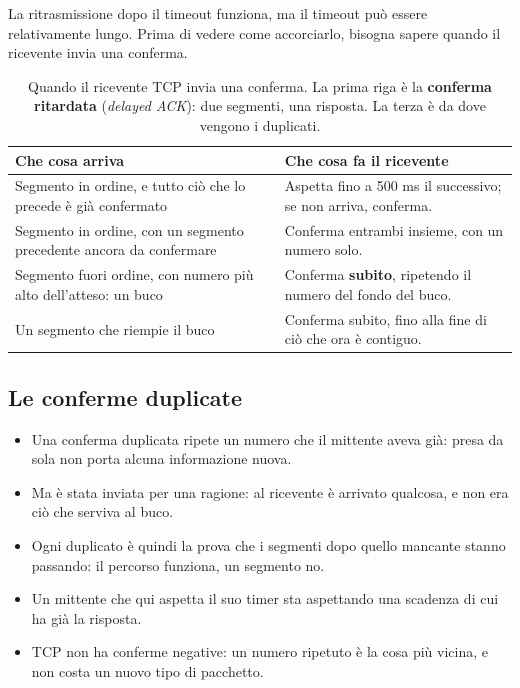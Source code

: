 La ritrasmissione dopo il timeout funziona, ma il timeout può essere relativamente lungo. Prima di vedere come
accorciarlo, bisogna sapere quando il ricevente invia una conferma.

\begin{table}[H]
\centering
\begin{tabular}{p{} p{}}
\toprule
\textbf{Che cosa arriva} & \textbf{Che cosa fa il ricevente} \\
\midrule
Segmento in ordine, e tutto ciò che lo precede è già confermato &
Aspetta fino a 500 ms il successivo; se non arriva, conferma. \\
Segmento in ordine, con un segmento precedente ancora da confermare &
Conferma entrambi insieme, con un numero solo. \\
Segmento fuori ordine, con numero più alto dell'atteso: un buco &
Conferma \textbf{subito}, ripetendo il numero del fondo del buco. \\
Un segmento che riempie il buco &
Conferma subito, fino alla fine di ciò che ora è contiguo. \\
\bottomrule
\end{tabular}
\caption{Quando il ricevente TCP invia una conferma. La prima riga è la \textbf{conferma ritardata}
         (\emph{delayed ACK}): due segmenti, una risposta. La terza è da dove vengono i duplicati.}
\end{table}

\subsection{Le conferme duplicate}

\begin{itemize}
    \item Una conferma duplicata ripete un numero che il mittente aveva già: presa da sola non porta alcuna informazione
          nuova.
    \item Ma è stata inviata per una ragione: al ricevente è arrivato qualcosa, e non era ciò che serviva al buco.
    \item Ogni duplicato è quindi la prova che i segmenti dopo quello mancante stanno passando: il percorso funziona, un
          segmento no.
    \item Un mittente che qui aspetta il suo timer sta aspettando una scadenza di cui ha già la risposta.
    \item TCP non ha conferme negative: un numero ripetuto è la cosa più vicina, e non costa un nuovo tipo di pacchetto.
\end{itemize}

